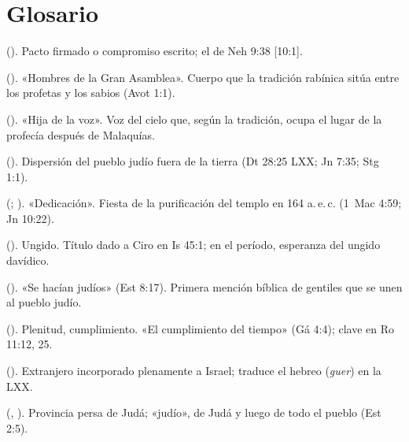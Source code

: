 \section*{Glosario}
\begin{description}\small
\item[Amaná] (). Pacto firmado o compromiso escrito; el de Neh 9:38 [10:1].
\item[Anshei Knéset ha-Guedolá] (). «Hombres de la Gran Asamblea». Cuerpo que la tradición rabínica sitúa entre los profetas y los sabios (Avot 1:1).
\item[Bat qol] (). «Hija de la voz». Voz del cielo que, según la tradición, ocupa el lugar de la profecía después de Malaquías.
\item[Diáspora] (). Dispersión del pueblo judío fuera de la tierra (Dt 28:25 LXX; Jn 7:35; Stg 1:1).
\item[Enkainia / Janucá] (; ). «Dedicación». Fiesta de la purificación del templo en 164 a.\,e.\,c. (1~Mac 4:59; Jn 10:22).
\item[Mashíaj] (). Ungido. Título dado a Ciro en Is 45:1; en el período, esperanza del ungido davídico.
\item[Mityahadim] (). «Se hacían judíos» (Est 8:17). Primera mención bíblica de gentiles que se unen al pueblo judío.
\item[Pleroma] (). Plenitud, cumplimiento. «El cumplimiento del tiempo» (Gá 4:4); clave en Ro 11:12, 25.
\item[Prosélito] (). Extranjero incorporado plenamente a Israel; traduce el hebreo  (\emph{guer}) en la LXX.
\item[Yehud / Yehudí] (, ). Provincia persa de Judá; «judío», de Judá y luego de todo el pueblo (Est 2:5).
\end{description}

